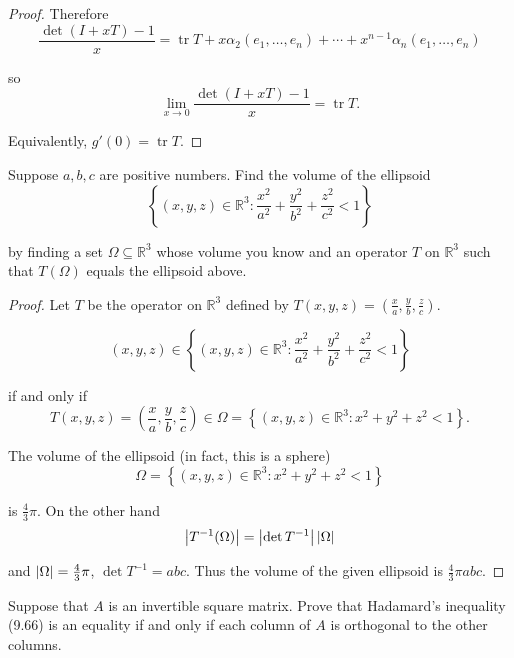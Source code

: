 \begin{proof}
    Therefore
    \[
        \frac{\det(I + xT) - 1}{x} = \operatorname{tr}T + x\alpha_{2}(e_{1}, \ldots, e_{n}) + \cdots + x^{n-1}\alpha_{n}(e_{1}, \ldots,e_{n})
    \]

    so
    \[
        \lim\limits_{x\to 0}\frac{\det(I + xT) - 1}{x} = \operatorname{tr}T.
    \]

    Equivalently, $g'(0) = \operatorname{tr}T$.
\end{proof}
\newpage

\begin{exercise}\label{chapter9:sectionC:exercise17}
    Suppose $a, b, c$ are positive numbers. Find the volume of the ellipsoid
    \[
        \left\{ (x,y,z)\in\mathbb{R}^{3}: \frac{x^{2}}{a^{2}} + \frac{y^{2}}{b^{2}} + \frac{z^{2}}{c^{2}} < 1 \right\}
    \]

    by finding a set $\Omega\subseteq\mathbb{R}^{3}$ whose volume you know and an operator $T$ on $\mathbb{R}^{3}$ such that $T(\Omega)$ equals the ellipsoid above.
\end{exercise}

\begin{proof}
    Let $T$ be the operator on $\mathbb{R}^{3}$ defined by $T(x, y, z) = \left(\frac{x}{a}, \frac{y}{b}, \frac{z}{c}\right)$.

    \[
        (x, y, z)\in \left\{ (x,y,z)\in\mathbb{R}^{3}: \frac{x^{2}}{a^{2}} + \frac{y^{2}}{b^{2}} + \frac{z^{2}}{c^{2}} < 1 \right\}
    \]

    if and only if
    \[
        T(x, y, z) = \left(\frac{x}{a}, \frac{y}{b}, \frac{z}{c}\right)\in \Omega = \left\{ (x,y,z)\in\mathbb{R}^{3}: x^{2} + y^{2} + z^{2} < 1 \right\}.
    \]

    The volume of the ellipsoid (in fact, this is a sphere)
    \[
        \Omega = \left\{ (x,y,z)\in\mathbb{R}^{3}: x^{2} + y^{2} + z^{2} < 1 \right\}
    \]

    is $\frac{4}{3}\pi$. On the other hand
    \[
        \left\vert{T^{-1}(\Omega)}\right\vert = \left\vert{\det T^{-1}}\right\vert\left\vert{\Omega}\right\vert
    \]

    and $\left\vert{\Omega}\right\vert = \frac{4}{3}\pi$, $\det T^{-1} = abc$. Thus the volume of the given ellipsoid is $\frac{4}{3}\pi abc$.
\end{proof}
\newpage

\begin{exercise}\label{chapter9:sectionC:exercise18}
    Suppose that $A$ is an invertible square matrix. Prove that Hadamard's inequality (9.66) is an equality if and only if each column of $A$ is orthogonal to the other columns.
\end{exercise}

